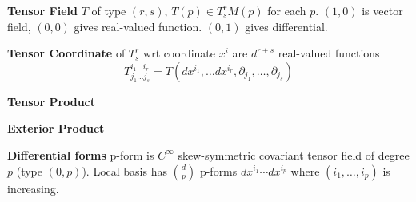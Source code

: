 \documentclass[12pt]{article}
\begin{document}
\textbf{Tensor Field} $T$ of type $(r,s)$, $T(p) \in T^r_s M (p)$ for each $p$. $(1,0)$  is vector field, $(0,0)$ gives real-valued function. $(0, 1)$ gives differential.

\textbf{Tensor Coordinate} of $T^r_s$ wrt coordinate $x^i$ are $d^{r+s}$ real-valued functions $$T^{i_1\ldots i_r}_{j_1\ldots j_s} = T(dx^{i_1}, \ldots dx^{i_r}, \partial_{j_1}, \ldots , \partial_{j_s})$$

\textbf{Tensor Product}

\textbf{Exterior Product}

\textbf{Differential forms} p-form is $C^\infty$ skew-symmetric covariant tensor field of degree $p$ (type $(0,p)$). Local basis has ${d \choose p}$ p-forms $dx^{i_1}\cdots dx^{i_p}$ where $(i_1,\ldots,i_p)$ is increasing.
\end{document}
